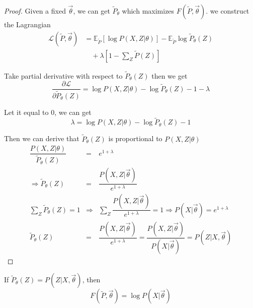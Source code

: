 \begin{proof}
Given a fixed $\vec{\theta}$, we can get $\tilde{P}_{\theta}$ which maximizes $F(\tilde{P},\vec{\theta})$. we construct the Lagrangian
\begin{equation}\begin{split}
\mathcal{L}(\tilde{P}, \vec{\theta}) & =\mathbb{E}_{\tilde{P}}\left[\log{P(X,Z|\theta)}\right]-\mathbb{E}_{\tilde{P}}\log\tilde{P}_{\theta}(Z) \\
                                     & \quad +\lambda\left[1-\sum\limits_Z{\tilde{P}(Z)}\right]
\end{split}\end{equation}

Take partial derivative with respect to $\tilde{P}_{\theta}(Z)$ then we get
\begin{equation}
\dfrac{\partial \mathcal{L}}{\partial{\tilde{P}_{\theta}(Z)}}=\log{P(X,Z|\theta)}-\log\tilde{P}_{\theta}(Z)-1-\lambda  \nonumber
\end{equation}

Let it equal to 0, we can get
\begin{equation}
\lambda=\log{P(X,Z|\theta)}-\log\tilde{P}_{\theta}(Z)-1 \nonumber
\end{equation}

Then we can derive that $\tilde{P}_{\theta}(Z)$ is proportional to $P(X,Z|\theta)$
\begin{eqnarray}
\dfrac{P(X,Z|\theta)}{\tilde{P}_{\theta}(Z)} &=& e^{1+\lambda} \nonumber \\
\Rightarrow \tilde{P}_{\theta}(Z) &=& \dfrac{P(X,Z|\vec{\theta})}{e^{1+\lambda}} \nonumber \\
\sum\limits_Z{\tilde{P}_{\theta}(Z)}=1 & \Rightarrow & \sum\limits_Z{\dfrac{P(X,Z|\vec{\theta})}{e^{1+\lambda}}}=1 \Rightarrow P(X|\vec{\theta})=e^{1+\lambda} \nonumber \\
\tilde{P}_{\theta}(Z) &=& \dfrac{P(X,Z|\vec{\theta})}{e^{1+\lambda}} = \dfrac{P(X,Z|\vec{\theta})}{P(X|\vec{\theta})}=P(Z|X, \vec{\theta}) \nonumber
\end{eqnarray}
\end{proof}

\begin{lemma}
If $\tilde{P}_{\theta}(Z)=P(Z|X, \vec{\theta})$, then
\begin{equation}
F(\tilde{P},\vec{\theta})=\log P(X|\vec{\theta})
\end{equation}
\end{lemma}

